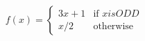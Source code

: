 \documentclass[preview]{standalone}
\begin{document}
\begin{align*}
f(x) =\begin{cases}3x + 1 & \text{if } x is ODD \\x / 2 & \text{otherwise}\end{cases}
\end{align*}
\end{document}
